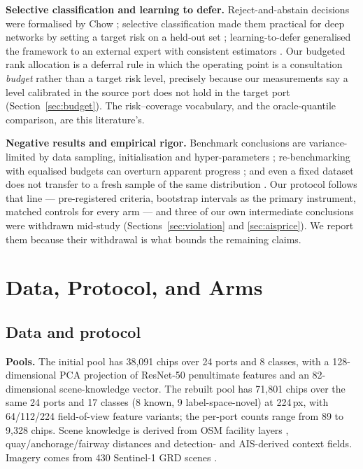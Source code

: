 \documentclass[journal]{IEEEtran}
\begin{document}
\textbf{Selective classification and learning to defer.} Reject-and-abstain decisions were formalised
by Chow \cite{chow1970optimum}; selective classification made them practical for deep networks by
setting a target risk on a held-out set \cite{geifman2017selective}; learning-to-defer generalised the
framework to an external expert \cite{madras2018predict} with consistent estimators
\cite{mozannar2020consistent}. Our budgeted rank allocation is a deferral rule in which the operating
point is a consultation \emph{budget} rather than a target risk level, precisely because our
measurements say a level calibrated in the source port does not hold in the target port
(Section~\ref{sec:budget}). The risk--coverage vocabulary, and the oracle-quantile comparison, are
this literature's.

\textbf{Negative results and empirical rigor.} Benchmark conclusions are variance-limited by data
sampling, initialisation and hyper-parameters \cite{bouthillier2021accounting}; re-benchmarking with
equalised budgets can overturn apparent progress \cite{musgrave2020metric}; and even a fixed dataset
does not transfer to a fresh sample of the same distribution \cite{recht2019imagenet}. Our protocol
follows that line --- pre-registered criteria, bootstrap intervals as the primary instrument, matched
controls for every arm --- and three of our own intermediate conclusions were withdrawn mid-study
(Sections~\ref{sec:violation} and \ref{sec:aisprice}). We report them because their withdrawal is what
bounds the remaining claims.

\section{Data, Protocol, and Arms}
\label{sec:method}

\subsection{Data and protocol}

\textbf{Pools.} The initial pool has 38{,}091 chips over 24 ports and 8 classes, with a
128-dimensional PCA projection of ResNet-50 penultimate features and an 82-dimensional scene-knowledge
vector. The rebuilt pool has 71{,}801 chips over the same 24 ports and 17 classes (8 known, 9
label-space-novel) at 224\,px, with 64/112/224 field-of-view feature variants; the per-port counts
range from 89 to 9{,}328 chips. Scene knowledge is derived from OSM facility layers
\cite{haklay2008osm}, quay/anchorage/fairway distances and detection- and AIS-derived context fields.
Imagery comes from 430 Sentinel-1 GRD scenes \cite{torres2012gmes}.
\end{document}
